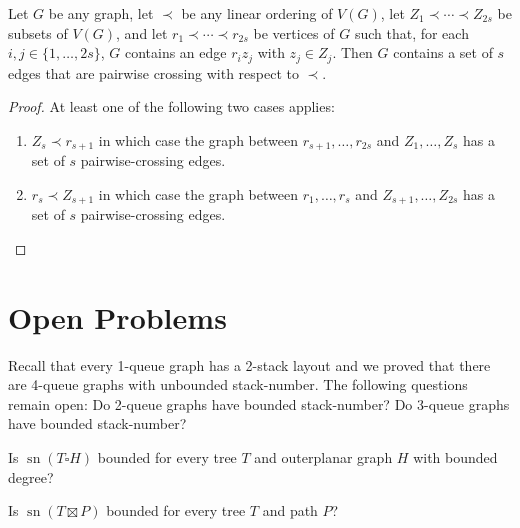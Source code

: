 \documentclass[kpfonts]{patmorin}
\DeclareMathOperator{\sn}{sn}
\begin{document}
\begin{lem}
    Let $G$ be any graph, let $\prec$ be any linear ordering of $V(G)$,  let $Z_{1}\prec\cdots\prec Z_{2s}$ be subsets of $V(G)$, and let $r_1\prec\cdots\prec r_{2s}$ be vertices of $G$ such that, for each $i,j\in\{1,\ldots,2s\}$, $G$ contains an edge $r_iz_j$ with $z_j\in Z_j$. Then $G$ contains a set of $s$ edges that are pairwise crossing with respect to $\prec$.
\end{lem}

\begin{proof}
    At least one of the following two cases applies:
    \begin{enumerate}
        \item $Z_s\prec r_{s+1}$ in which case the graph between $r_{s+1},\ldots,r_{2s}$ and $Z_1,\ldots,Z_s$ has a set of $s$ pairwise-crossing edges.
        \item $r_{s}\prec Z_{s+1}$ in which case the graph between $r_1,\ldots,r_s$ and $Z_{s+1},\ldots,Z_{2s}$ has a set of $s$ pairwise-crossing edges. \qedhere
    \end{enumerate}
\end{proof}

\section{Open Problems}

Recall that every 1-queue graph has a 2-stack layout \citep{HLR92} and we proved that there are 4-queue graphs with unbounded stack-number. The following questions remain open: Do 2-queue graphs have bounded stack-number? Do 3-queue graphs have bounded stack-number?

Is $\sn(T \square H)$ bounded for every tree $T$ and outerplanar graph $H$ with bounded degree?

Is $\sn(T \boxtimes P)$ bounded for every tree $T$ and path $P$?


%
%
\end{document}
